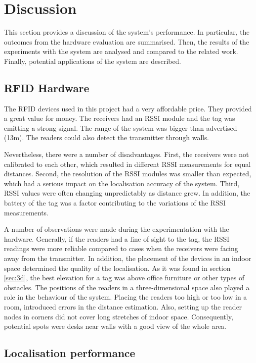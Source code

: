 \section{Discussion}

This section provides a discussion of the system's performance. In particular, the outcomes from the hardware evaluation are summarised. Then, the results of the experiments with the system are analysed and compared to the related work. Finally, potential applications of the system are described.

\subsection{RFID Hardware}

The RFID devices used in this project had a very affordable price. They provided a great value for money. The receivers had an RSSI module and the tag was emitting a strong signal. The range of the system was bigger than advertised  (13m). The readers could also detect the transmitter through walls.

Nevertheless, there were a number of disadvantages. First, the receivers were not calibrated to each other, which resulted in different RSSI measurements for equal distances. Second, the resolution of the RSSI modules was smaller than expected, which had a serious impact on the localisation accuracy of the system. Third, RSSI values were often changing unpredictably as distance grew. In addition, the battery of the tag was a factor contributing to the variations of the RSSI measurements.

A number of observations were made during the experimentation with the hardware. Generally, if the readers had a line of sight to the tag, the RSSI readings were more reliable compared to cases when the receivers were facing away from the transmitter. In addition, the placement of the devices in an indoor space determined the quality of the localisation. As it was found in section \ref{sec:3d}, the best elevation for a tag was above office furniture or other types of obstacles. The positions of the readers in a three-dimensional space also played a role in the behaviour of the system. Placing the readers too high or too low in a room, introduced errors in the distance estimation. Also, setting up the reader nodes in corners did not cover long stretches of indoor space. Consequently, potential spots were desks near walls with a good view of the whole area.

\subsection{Localisation performance}

